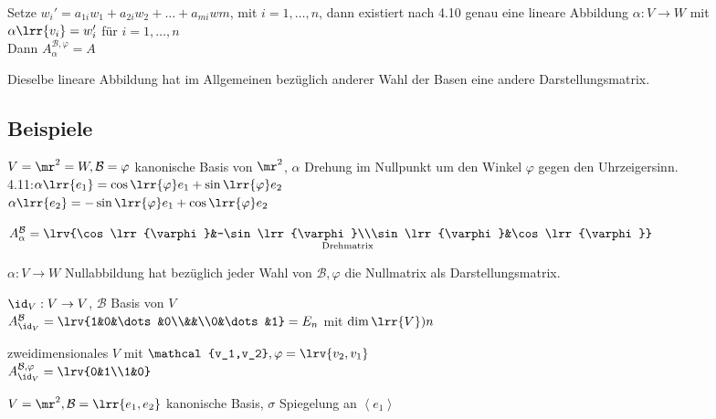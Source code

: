 			Setze $w_i'=a_{1i}w_1+a_{2i}w_2+\dots+a_{mi}w{m}$, mit $i=1,\dots,n$, dann existiert nach 4.10 genau eine lineare Abbildung $\alpha:V\rightarrow W$ mit $\alpha\lrr{v_i}=w_i'$ für $i=1,\dots,n$\\
			Dann $A_{\alpha}^{\mathcal{B}, \varphi}=A$
		\item Dieselbe lineare Abbildung hat im Allgemeinen bezüglich anderer Wahl der Basen eine andere Darstellungsmatrix.
	\subExEnd
	
\subsection{Beispiele}
		\item $V=\mr^2=W, \mathcal{B}=\varphi$ kanonische Basis von $\mr^2$, $\alpha$ Drehung im Nullpunkt um den Winkel $\varphi$ gegen den Uhrzeigersinn.\\
			4.11:$\alpha\lrr{e_1}=\cos\lrr{\varphi}e_1+\sin\lrr{\varphi}e_2$\\
			$\alpha\lrr{e_2}=-\sin\lrr{\varphi}e_1+\cos\lrr{\varphi}e_2$
			
			$A_{\alpha}^{\mathcal{B}}=\underset{\mbox{\scriptsize Drehmatrix}}{\lrv{\cos\lrr{\varphi}&-\sin\lrr{\varphi}\\\sin\lrr{\varphi}&\cos\lrr{\varphi}}}$
		\item $\alpha:V\rightarrow W$ Nullabbildung hat bezüglich jeder Wahl von $\mathcal{B},\varphi$ die Nullmatrix als Darstellungsmatrix.
		\item $\id_V:V\rightarrow V$, $\mathcal{B}$ Basis von $V$\\
			$A_{\id_V}^{\mathcal{B}}=\lrv{1&0&\dots&0\\&&\\0&\dots&1}=E_n$ mit $\dim\lrr{V})n$
		\item zweidimensionales $V$ mit $\mathcal{v_1,v_2},\varphi=\lrv{v_2,v_1}$\\
			$A_{\id_V}^{\mathcal{B},\varphi}=\lrv{0&1\\1&0}$
		\item $V=\mr^2,\mathcal{B}=\lrr{e_1,e_2}$ kanonische Basis, $\sigma$ Spiegelung an $\left\langle e_1\right\rangle$


